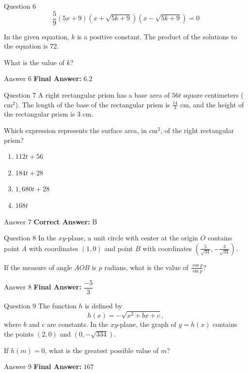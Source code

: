 \documentclass{beamer}
\begin{document}
\begin{frame}{Question 6}
\small
\[
\frac{5}{9}(5x + 9)\left(x + \sqrt{5k + 9}\right)\left(x - \sqrt{5k + 9}\right) = 0
\]

In the given equation, \(k\) is a positive constant. The product of the solutions to the equation is \(72\).

What is the value of \(k\)?
\end{frame}
\begin{frame}{Answer 6}
\small
\textbf{Final Answer:} $\boxed{6.2}$
\end{frame}

\begin{frame}{Question 7}
\small
A right rectangular prism has a base area of \(56t\) square centimeters (\(\text{cm}^2\)). The length of the base of the rectangular prism is \(\frac{14}{3}\) cm, and the height of the rectangular prism is \(3\) cm.

Which expression represents the surface area, in \(\text{cm}^2\), of the right rectangular prism?
\vspace{0.35cm}
\begin{enumerate}
    \item[A.] \(112t + 56\)
    \item[B.] \(184t + 28\)
    \item[C.] \(1{,}680t + 28\)
    \item[D.] \(168t\)
\end{enumerate}
\end{frame}
\begin{frame}{Answer 7}
\small
\textbf{Correct Answer:} B
\end{frame}

\begin{frame}{Question 8}
\small
In the \(xy\)-plane, a unit circle with center at the origin \(O\) contains point \(A\) with coordinates \((1, 0)\) and point \(B\) with coordinates \(\left(\frac{5}{\sqrt{34}}, -\frac{3}{\sqrt{34}}\right)\).

If the measure of angle \(AOB\) is \(p\) radians, what is the value of \(\frac{\cos p}{\sin p}\)?
\end{frame}
\begin{frame}{Answer 8}
\small
\textbf{Final Answer:} $\boxed{\dfrac{-5}{3}}$
\end{frame}

\begin{frame}{Question 9}
\small
The function \(h\) is defined by
\[
h(x) = -\sqrt{x^2 + bx + c},
\]
where \(b\) and \(c\) are constants. In the \(xy\)-plane, the graph of \(y = h(x)\) contains the points \((2, 0)\) and \(\left(0, -\sqrt{334}\right)\).

If \(h(m) = 0\), what is the greatest possible value of \(m\)?
\end{frame}
\begin{frame}{Answer 9}
\small
\textbf{Final Answer:} $\boxed{167}$
\end{frame}
\end{document}
